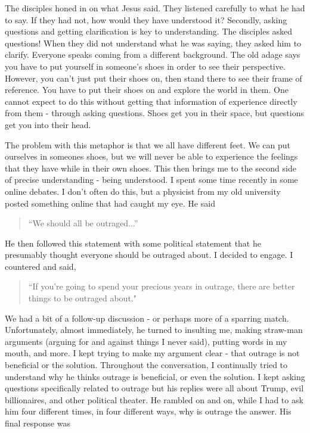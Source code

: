 \documentclass[10pt]{article}
\begin{document}
\begin{multicols}{2}
The disciples honed in on what Jesus said. They listened carefully to what he had to say. If they had not, how would they have understood it? Secondly, asking questions and getting clarification is key to understanding. The disciples asked questions! When they did not understand what he was saying, they asked him to clarify. Everyone speaks coming from a different background. The old adage says you have to put yourself in someone's shoes in order to see their perspective. However, you can't just put their shoes on, then stand there to see their frame of reference. You have to put their shoes on and explore the world in them. One cannot expect to do this without getting that information of experience directly from them - through asking questions. Shoes get you in their space, but questions get you into their head.

The problem with this metaphor is that we all have different feet. We can put ourselves in someones shoes, but we will never be able to experience the feelings that they have while in their own shoes. This then brings me to the second side of precise understanding - being understood. I spent some time recently in some online debates. I don't often do this, but a physicist from my old university posted something online that had caught my eye. He said

\begin{quotation}
``We should all be outraged...''
\end{quotation}

He then followed this statement with some political statement that he presumably thought everyone should be outraged about. I decided to engage. I countered and said, 

\begin{quotation}
``If you're going to spend your precious years in outrage, there are better things to be outraged about."
\end{quotation}

We had a bit of a follow-up discussion - or perhaps more of a sparring match. Unfortunately, almost immediately, he turned to insulting me, making straw-man arguments (arguing for and against things I never said), putting words in my mouth, and more. I kept trying to make my argument clear - that outrage is not beneficial or the solution. Throughout the conversation, I continually tried to understand why he thinks outrage is beneficial, or even the solution. I kept asking questions specifically related to outrage but his replies were all about Trump, evil billionaires, and other political theater. He rambled on and on, while I had to ask him four different times, in four different ways, why is outrage the answer. His final response was


\end{multicols}
\end{document}
